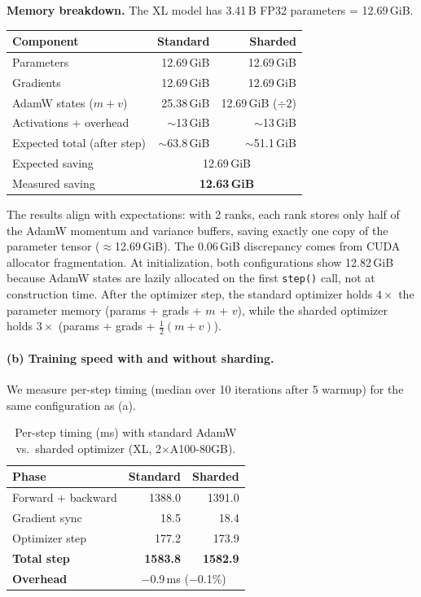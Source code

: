\documentclass[11pt]{article}
\begin{document}
\textbf{Memory breakdown.}
The XL model has 3.41\,B FP32 parameters = 12.69\,GiB.

\begin{center}
\begin{tabular}{l rr}
\toprule
Component & Standard & Sharded \\
\midrule
Parameters              & 12.69\,GiB & 12.69\,GiB \\
Gradients               & 12.69\,GiB & 12.69\,GiB \\
AdamW states ($m + v$)  & 25.38\,GiB & 12.69\,GiB ($\div 2$) \\
Activations + overhead  & $\sim$13\,GiB & $\sim$13\,GiB \\
\midrule
Expected total (after step) & $\sim$63.8\,GiB & $\sim$51.1\,GiB \\
Expected saving             & \multicolumn{2}{c}{12.69\,GiB} \\
Measured saving             & \multicolumn{2}{c}{\textbf{12.63\,GiB}} \\
\bottomrule
\end{tabular}
\end{center}

The results align with expectations: with 2 ranks, each rank stores
only half of the AdamW momentum and variance buffers, saving exactly
one copy of the parameter tensor ($\approx$12.69\,GiB).
The 0.06\,GiB discrepancy comes from CUDA allocator fragmentation.
At initialization, both configurations show 12.82\,GiB because
AdamW states are lazily allocated on the first \texttt{step()} call,
not at construction time.  After the optimizer step, the standard
optimizer holds $4\times$ the parameter memory (params + grads + $m$ + $v$),
while the sharded optimizer holds $3\times$ (params + grads + $\frac{1}{2}(m + v)$).

\paragraph{(b) Training speed with and without sharding.}

We measure per-step timing (median over 10 iterations after 5 warmup)
for the same configuration as (a).

\begin{table}[H]
\centering
\caption{Per-step timing (ms) with standard AdamW vs.\ sharded optimizer
  (XL, 2$\times$A100-80GB).}
\label{tab:sharded-speed}
\begin{tabular}{l rr}
\toprule
Phase & Standard & Sharded \\
\midrule
Forward + backward     & 1388.0 & 1391.0 \\
Gradient sync          &   18.5 &   18.4 \\
Optimizer step         &  177.2 &  173.9 \\
\midrule
\textbf{Total step}    & \textbf{1583.8} & \textbf{1582.9} \\
\textbf{Overhead}       & \multicolumn{2}{c}{$-$0.9\,ms ($-$0.1\%)} \\
\bottomrule
\end{tabular}
\end{table}
\end{document}
